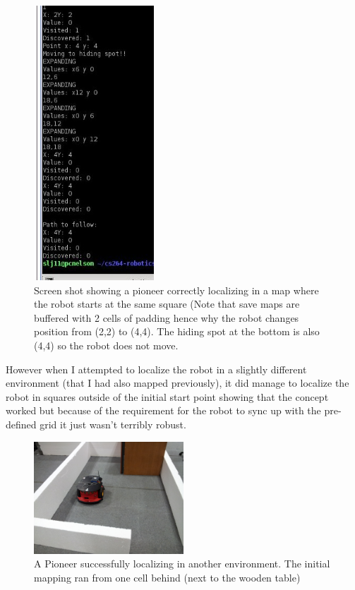 \documentclass{article}
\begin{document}
\begin{figure}[H]
\centering
\includegraphics[width=0.4\textwidth]{img/robot_pics/localize1.jpg}
\caption{Screen shot showing a pioneer correctly localizing in a map where the robot starts at the same square (Note that save maps are buffered with 2 cells of padding hence why the robot changes position from (2,2) to (4,4). The hiding spot at the bottom is also (4,4) so the robot does not move.}
\label{fig:robot-map-localize1}
\end{figure}

However when I attempted to localize the robot in a slightly different environment (that I had also mapped previously), it did manage to localize the robot in squares outside of the initial start point showing that the concept worked but because of the requirement for the robot to sync up with the pre-defined grid it just wasn't terribly robust.

\begin{figure}[H]
\centering
\includegraphics[width=0.5\textwidth]{img/robot_pics/20130416_142622.jpg}
\caption{A Pioneer successfully localizing in another environment. The initial mapping ran from one cell behind (next to the wooden table)}
\label{fig:robot-map-localize2}
\end{figure}
\end{document}
